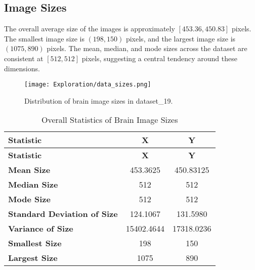\subsection{Image Sizes}\label{image_sizes}
The overall average size of the images is approximately $[453.36, 450.83]$ pixels. The smallest image size is $(198, 150)$ pixels, and the largest image size is $(1075, 890)$ pixels. The mean, median, and mode sizes across the dataset are consistent at $[512, 512]$ pixels, suggesting a central tendency around these dimensions.


\begin{figure}[H]
  \begin{center}
    \texttt{[image: Exploration/data\_sizes.png]}
  \end{center}
  \caption{Distribution of brain image sizes in dataset\_19.}\label{fig:data_sizes}
\end{figure}

\begin{longtable}{|l|c|c|}
\caption{Overall Statistics of Brain Image Sizes}\\
\hline
\textbf{Statistic} & \textbf{X} & \textbf{Y} \\
\hline
\endfirsthead
\hline
\textbf{Statistic} & \textbf{X} & \textbf{Y} \\
\hline
\endhead
\hline
\endfoot
\endlastfoot
\textbf{Mean Size} & 453.3625 & 450.83125 \\
\hline
\textbf{Median Size} & 512 & 512 \\
\hline
\textbf{Mode Size} & 512 & 512 \\
\hline
\textbf{Standard Deviation of Size} & 124.1067 & 131.5980 \\
\hline
\textbf{Variance of Size} & 15402.4644 & 17318.0236 \\
\hline
\textbf{Smallest Size} & 198 & 150 \\
\hline
\textbf{Largest Size} & 1075 & 890 \\
\hline
\end{longtable}

\vspace{1cm}

